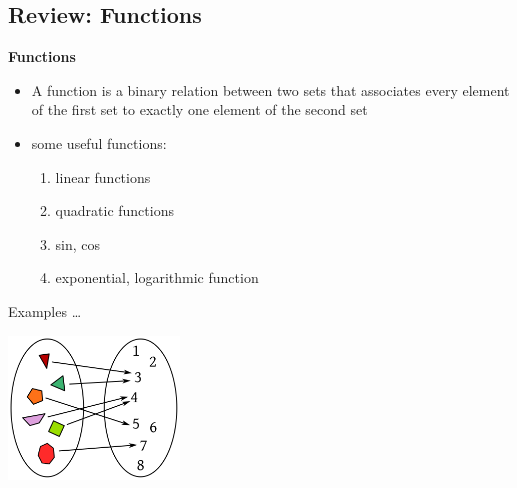 \documentclass[]{beamer}
\begin{document}
\subsection{Review:  Functions}
\begin{frame}


   \textbf{Functions}
   \pause
   \vspace{3mm}


\begin{itemize}
\item A function is a binary relation between two sets that associates every element of the first set to exactly one element of the second set
\pause
\item some useful functions:
	\begin{enumerate}
	\item linear functions
	\item quadratic functions
	\item sin, cos
	\item exponential, logarithmic function
	\end{enumerate}

\end{itemize}


 \end{frame}
\begin{frame}


  Examples \dots
   \pause
   \vspace{3mm}

   \begin{center}
      \includegraphics[height=1.5in]{images/PolygonsFunction.png}
    \end{center}


 \end{frame}
\end{document}
